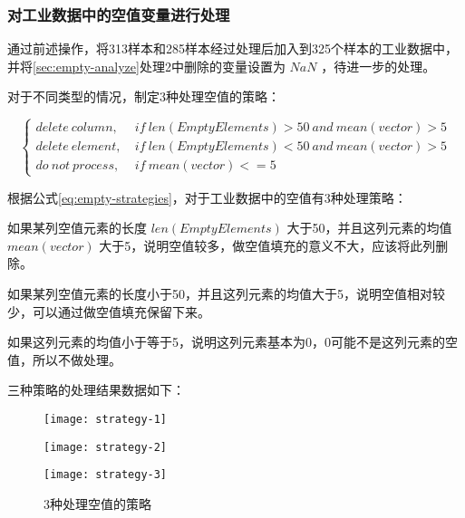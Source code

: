\documentclass[bwprint]{gmcmthesis}
\begin{document}
\FloatBarrier
\subsubsection{对工业数据中的空值变量进行处理}\label{sec:process-all-nan}

通过前述操作，将313样本和285样本经过处理后加入到325个样本的工业数据中，并将\ref{sec:empty-analyze}处理2中删除的变量设置为 $NaN$ ，待进一步的处理。

对于不同类型的情况，制定3种处理空值的策略：

\begin{equation}\label{eq:empty-strategies}
\left\{
\begin{aligned}
delete \ column, \ & if \ len(EmptyElements)>50 \ and \ mean(vector)>5 \\  
delete \ element, \ & if \ len(EmptyElements)<50 \ and \ mean(vector)>5\\  
do \ not \ process, \ & if \ mean(vector)<=5
\end{aligned}
\right.
\end{equation}

根据公式\eqref{eq:empty-strategies}，对于工业数据中的空值有3种处理策略：

\begin{list}{策略\themylist}{}
	\item 如果某列空值元素的长度 $len(EmptyElements)$ 大于50，并且这列元素的均值 $ mean(vector)$ 大于5，说明空值较多，做空值填充的意义不大，应该将此列删除。
	\item 如果某列空值元素的长度小于50，并且这列元素的均值大于5，说明空值相对较少，可以通过做空值填充保留下来。
	\item 如果这列元素的均值小于等于5，说明这列元素基本为0，0可能不是这列元素的空值，所以不做处理。
\end{list}


三种策略的处理结果数据如下：






\begin{figure}[htb]
	\centering
	\begin{minipage}[c]{0.4\textwidth}
		\centering
		\texttt{[image: strategy-1]}
	\end{minipage}
	\begin{minipage}[c]{0.4\textheight}
		\centering
		\texttt{[image: strategy-2]}
	\end{minipage}
	\begin{minipage}[c]{0.4\textwidth}
		\centering
		\texttt{[image: strategy-3]}
	\end{minipage}
	\caption{3种处理空值的策略}
\end{figure}
\end{document}
